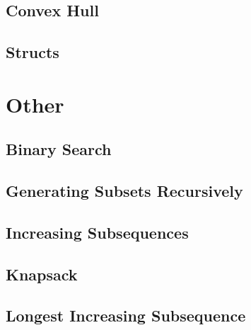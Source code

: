 \subsection{Convex Hull}
\raggedbottom
\hrulefill
\subsection{Structs}
\raggedbottom
\hrulefill

\section{Other}
\subsection{Binary Search}
\raggedbottom
\hrulefill
\subsection{Generating Subsets Recursively}
\raggedbottom
\hrulefill
\subsection{Increasing Subsequences}
\raggedbottom
\hrulefill
\subsection{Knapsack}
\raggedbottom
\hrulefill
\subsection{Longest Increasing Subsequence}
\raggedbottom
\hrulefill

